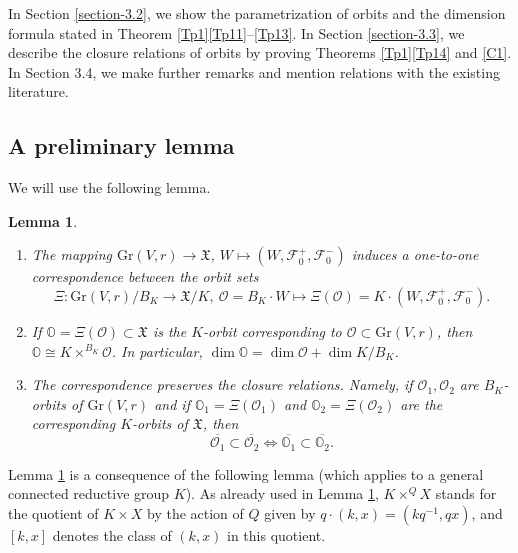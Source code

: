\documentclass[11pt]{article}
\newtheorem{lemma}[theo]{Lemma}
\theoremstyle{definition}
\numberwithin{equation}{section}
\newcommand{\flag}{\mathcal{F}}
\newcommand{\Xorbit}{\mathbb{O}}
\newcommand{\Gorbit}{\mathcal{O}}
\newcommand{\Xfv}{\mathfrak{X}}
\newcommand{\Grass}{\mathrm{Gr}}
\begin{document}
In Section \ref{section-3.2}, we show the parametrization of orbits and the dimension formula stated in Theorem \ref{Tp1}\ref{Tp11}--\ref{Tp13}. In Section \ref{section-3.3}, we describe the closure relations of orbits
by proving Theorems \ref{Tp1}\ref{Tp14} and \ref{C1}.
In Section 3.4, we make further remarks and mention relations with the existing literature.


\subsection{A preliminary lemma}

\label{section-3.1}

We will use the following lemma.


\begin{lemma}
\label{L3.1}
\begin{enumerate}
\item The mapping $\Grass(V,r)\to\Xfv$, $W\mapsto (W,\flag_0^+,\flag_0^-)$ induces a one-to-one correspondence between the orbit sets
\[\Xi:\Grass(V,r)/B_K\to \Xfv/K,\ \Gorbit=B_K\cdot W\mapsto \Xi(\Gorbit)=K\cdot (W,\flag_0^+,\flag_0^-).\]
\item If $\Xorbit=\Xi(\Gorbit)\subset\Xfv$ is the $K$-orbit corresponding to $\Gorbit\subset\Grass(V,r)$, then $\Xorbit\cong K\times^{B_K}\Gorbit$. In particular, $\dim\Xorbit=\dim\Gorbit+\dim K/B_K$.
\item The correspondence preserves the closure relations. Namely, if $\Gorbit_1,\Gorbit_2$ are $B_K$-orbits of $\Grass(V,r)$ and if $\Xorbit_1=\Xi(\Gorbit_1)$ and $\Xorbit_2=\Xi(\Gorbit_2)$ are the corresponding $K$-orbits of $\Xfv$, then
\[\overline{\Gorbit_1}\subset\overline{\Gorbit_2}\iff \overline{\Xorbit_1}\subset\overline{\Xorbit_2}.\]
\end{enumerate}
\end{lemma}

Lemma \ref{L3.1} is a consequence of the following lemma (which applies to a general connected reductive group $K$).
As already used in Lemma \ref{L3.1}, $K\times^QX$ stands for the quotient of $K\times X$ by the action of $Q$ given by $q\cdot(k,x)=(kq^{-1},qx)$, and $[k,x]$ denotes the class of $(k,x)$ in this quotient. %
\end{document}
